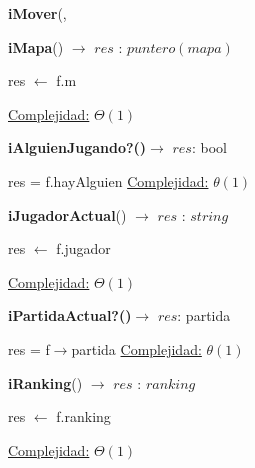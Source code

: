 \documentclass[10pt,a4paper]{article}
\begin{document}
\begin{Algoritmos}
\begin{algorithm}[H]{\textbf{iMover}(, }
    \end{algorithm}
        
    \begin{algorithm}[H]{\textbf{iMapa}() $\to$ $res$ : $puntero(mapa)$}
        \begin{algorithmic}
        
            \State res $\leftarrow$ f.m
            
        
            \Statex \underline{Complejidad:} $\Theta(1)$
        \end{algorithmic}
    \end{algorithm}
    
    \begin{algorithm}[H]{\textbf{iAlguienJugando?()}}$\to$ $res$: bool
        \begin{algorithmic}
            \State res = f.hayAlguien
            \State \underline{Complejidad:} $\theta(1)$
        \end{algorithmic}
    \end{algorithm}

    \begin{algorithm}[H]{\textbf{iJugadorActual}() $\to$ $res$ : $string$}
        \begin{algorithmic}
        
            \State res $\leftarrow$ f.jugador
            
        
            \Statex \underline{Complejidad:} $\Theta(1)$
        \end{algorithmic}
    \end{algorithm}

    \begin{algorithm}[H]{\textbf{iPartidaActual?()}}$\to$ $res$: partida
        \begin{algorithmic}
            \State res = f$\to$partida
            \State \underline{Complejidad:} $\theta(1)$
        \end{algorithmic}
    \end{algorithm}
        
    \begin{algorithm}[H]{\textbf{iRanking}() $\to$ $res$ : $ranking$}
        \begin{algorithmic}
        
            \State res $\leftarrow$ f.ranking
            
        
            \Statex \underline{Complejidad:} $\Theta(1)$
        \end{algorithmic}
    \end{algorithm}


\end{Algoritmos}
\end{document}
